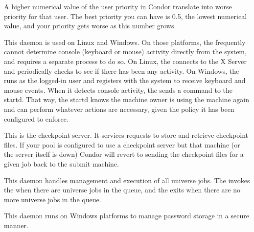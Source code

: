 \begin{description}
\Note A higher numerical value of the user priority in Condor
translate into worse priority for that user.  The best priority you
can have is 0.5, the lowest numerical value, and your priority gets
worse as this number grows.

\item[\Condor{kbdd}] This daemon
is used on Linux and Windows.
On those platforms, the  frequently cannot determine
console (keyboard or mouse) activity directly from the system, and
requires a separate process to do so.
On Linux, the
 connects to the X Server and periodically checks to see
if there has been any activity.
On Windows, the  runs as the logged-in user and registers
with the system to receive keyboard and mouse events.
When it detects console activity, the  sends a
command to the startd.  That way, the startd knows the machine owner
is using the machine again and can perform whatever actions are
necessary, given the policy it has been configured to enforce.

\item[\Condor{ckpt\_server}] This is the checkpoint server.
It services requests to store and retrieve checkpoint files.  If your
pool is configured to use a checkpoint server but that machine (or the
server itself is down) Condor will revert to sending the checkpoint
files for a given job back to the submit machine.

\item[\Condor{gridmanager}] This daemon
handles management and execution of all 
universe jobs.
The  invokes the  when
there are  universe jobs in the queue,
and the  exits when there are no more
 universe jobs in the queue.

\item[\Condor{credd}] This daemon
runs on Windows platforms to manage password storage in a secure manner.


\end{description}
